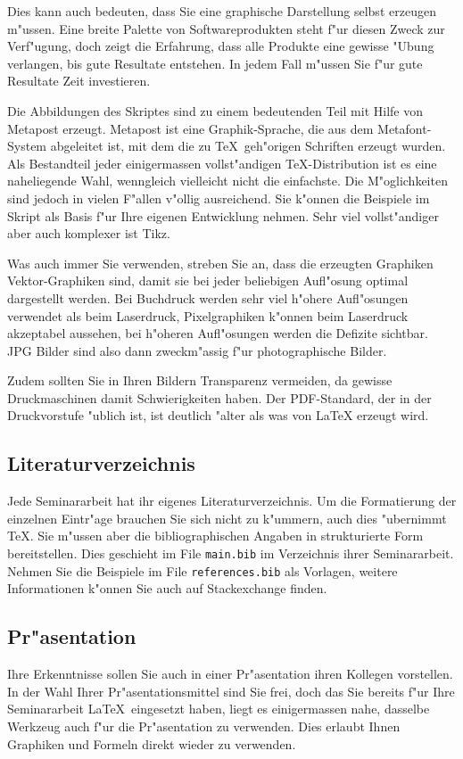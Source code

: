 \documentclass[a4paper,12pt]{article}
\begin{document}
Dies kann auch bedeuten, dass Sie eine graphische Darstellung selbst
erzeugen m"ussen.
Eine breite Palette von Softwareprodukten steht f"ur diesen Zweck
zur Verf"ugung, doch zeigt die Erfahrung, dass alle Produkte
eine gewisse "Ubung verlangen, bis gute Resultate entstehen.
In jedem Fall m"ussen Sie f"ur gute Resultate Zeit investieren.

Die Abbildungen des Skriptes sind zu einem bedeutenden Teil mit
Hilfe von Metapost erzeugt.
Metapost ist eine Graphik-Sprache, die aus dem Metafont-System abgeleitet ist,
mit dem die zu \TeX\ geh"origen Schriften erzeugt wurden.
Als Bestandteil jeder einigermassen vollst"andigen \TeX-Distribution
ist es eine naheliegende Wahl, wenngleich vielleicht nicht die einfachste.
Die M"oglichkeiten sind jedoch in vielen F"allen v"ollig ausreichend.
Sie k"onnen die Beispiele im Skript als Basis f"ur Ihre eigenen Entwicklung
nehmen.
Sehr viel vollst"andiger aber auch komplexer ist Tikz.

Was auch immer Sie verwenden, streben Sie an, dass die erzeugten Graphiken
Vektor-Graphiken sind, damit sie bei jeder beliebigen Aufl"osung
optimal dargestellt werden.
Bei Buchdruck werden sehr viel h"ohere Aufl"osungen verwendet als
beim Laserdruck, Pixelgraphiken k"onnen beim Laserdruck akzeptabel
aussehen, bei h"oheren Aufl"osungen werden die Defizite sichtbar.
JPG Bilder sind also dann zweckm"assig f"ur photographische Bilder.

Zudem sollten Sie in Ihren Bildern Transparenz vermeiden, da gewisse
Druckmaschinen damit Schwierigkeiten haben. Der PDF-Standard, der
in der Druckvorstufe "ublich ist, ist deutlich "alter als was von
\LaTeX{} erzeugt wird.

\subsection{Literaturverzeichnis}
Jede Seminararbeit hat ihr eigenes Literaturverzeichnis.
Um die Formatierung der einzelnen Eintr"age brauchen Sie sich nicht
zu k"ummern, auch dies "ubernimmt \TeX.
Sie m"ussen aber die bibliographischen Angaben in strukturierte
Form bereitstellen. 
Dies geschieht im File \texttt{main.bib} im Verzeichnis ihrer
Seminararbeit.
Nehmen Sie die Beispiele im File \texttt{references.bib} als
Vorlagen, weitere Informationen k"onnen Sie auch auf Stackexchange finden.

\subsection{Pr"asentation}
Ihre Erkenntnisse sollen Sie auch in einer Pr"asentation ihren Kollegen
vorstellen.
In der Wahl Ihrer Pr"asentationsmittel sind Sie frei, doch das Sie
bereits f"ur Ihre Seminararbeit \LaTeX\ eingesetzt haben, 
liegt es einigermassen nahe, dasselbe Werkzeug auch f"ur die Pr"asentation
zu verwenden.
Dies erlaubt Ihnen Graphiken und Formeln direkt wieder zu verwenden.
\end{document}
